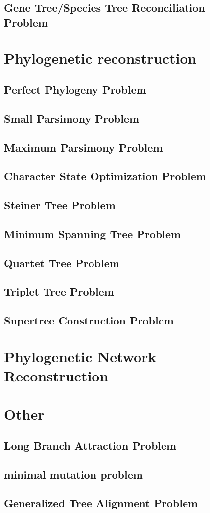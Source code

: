 
\subsection{Gene Tree/Species Tree Reconciliation Problem}
\section{Phylogenetic reconstruction}
\subsection{Perfect Phylogeny Problem}
\subsection{Small Parsimony Problem}
\subsection{Maximum Parsimony Problem}
\subsection{Character State Optimization Problem}
\subsection{Steiner Tree Problem}
\subsection{Minimum Spanning Tree Problem}
\subsection{Quartet Tree Problem}
\subsection{Triplet Tree Problem}
\subsection{Supertree Construction Problem}
\section{Phylogenetic Network Reconstruction}
\section{Other}
\subsection{Long Branch Attraction Problem}
\subsection{minimal mutation problem}
\subsection{Generalized Tree Alignment Problem}